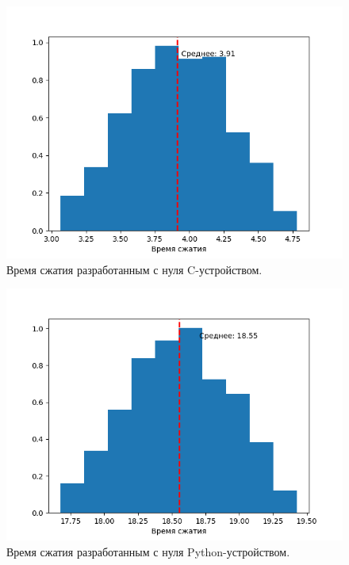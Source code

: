 \begin{figure}[!htbp]
    \centering
    \begin{adjustbox}{max totalsize={0.8\textwidth}{\textheight}}
        \includegraphics{images/hist-handmade-c-dev.png}
    \end{adjustbox}
    \caption{Время сжатия разработанным с нуля C-устройством.}\label{fig:hist-handmade-c-dev}
\end{figure}


\begin{figure}[!htbp]
    \centering
    \begin{adjustbox}{max totalsize={0.8\textwidth}{\textheight}}
        \includegraphics{images/hist-handmade-py-dev.png}
    \end{adjustbox}
    \caption{Время сжатия разработанным с нуля Python-устройством.}\label{fig:hist-handmade-py-dev}
\end{figure}


